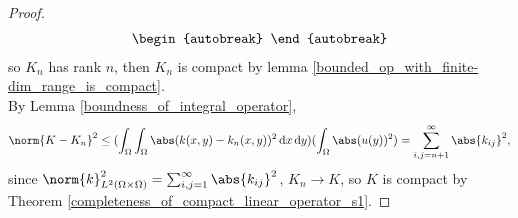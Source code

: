 \documentclass[a4paper]{book}
\newcommand\diff{\,\mathrm{d}}
\DeclarePairedDelimiter{\norm}\lVert\rVert
\DeclarePairedDelimiter{\abs}\lvert\rvert
\begin{document}
\begin{proof}
\begin{align*}
\begin{autobreak}
        \end{autobreak}
    \end{align*}
    so $K_n$ has rank $n$, then $K_n$ is compact by lemma \ref{bounded_op_with_finite-dim_range_is_compact}.\\
    By Lemma \ref{boundness_of_integral_operator},
    \begin{align*}
        \norm{K-K_n}^2 \leq (\int_{\Omega}\int_{\Omega}\abs(k(x,y)-k_n(x,y))^2 \diff x \diff y)(\int_{\Omega}\abs(u(y))^2) = \sum_{i,j=n+1}^{\infty}\abs{k_{ij}}^2,
    \end{align*}
    since $\norm{k}_{L^2(\Omega \times \Omega)}^2 = \sum_{i,j=1}^{\infty}\abs{k_{ij}}^2$, $K_n \to K$, so $K$ is compact by Theorem \ref{completeness_of_compact_linear_operator_s1}.
\end{proof}
\end{document}
